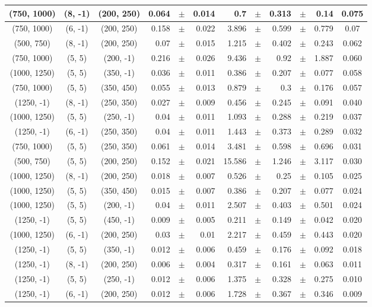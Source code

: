 \documentclass[12pt]{paper}
\begin{document}
\begin{table}[ht]
\begin{center}
{\begin{tabular}{|c|c|c|rrr|rrrrr|c|}
(750, 1000)&(8, -1)&(200, 250)&0.064&$\pm$&0.014&0.7&$\pm$&0.313&$\pm$&0.14&0.075\\\hline
(750, 1000)&(6, -1)&(200, 250)&0.158&$\pm$&0.022&3.896&$\pm$&0.599&$\pm$&0.779&0.07\\\hline
(500, 750)&(8, -1)&(200, 250)&0.07&$\pm$&0.015&1.215&$\pm$&0.402&$\pm$&0.243&0.062\\\hline
(750, 1000)&(5, 5)&(200, -1)&0.216&$\pm$&0.026&9.436&$\pm$&0.92&$\pm$&1.887&0.060\\\hline
(1000, 1250)&(5, 5)&(350, -1)&0.036&$\pm$&0.011&0.386&$\pm$&0.207&$\pm$&0.077&0.058\\\hline
(750, 1000)&(5, 5)&(350, 450)&0.055&$\pm$&0.013&0.879&$\pm$&0.3&$\pm$&0.176&0.057\\\hline
(1250, -1)&(8, -1)&(250, 350)&0.027&$\pm$&0.009&0.456&$\pm$&0.245&$\pm$&0.091&0.040\\\hline
(1000, 1250)&(5, 5)&(250, -1)&0.04&$\pm$&0.011&1.093&$\pm$&0.288&$\pm$&0.219&0.037\\\hline
(1250, -1)&(6, -1)&(250, 350)&0.04&$\pm$&0.011&1.443&$\pm$&0.373&$\pm$&0.289&0.032\\\hline
(750, 1000)&(5, 5)&(250, 350)&0.061&$\pm$&0.014&3.481&$\pm$&0.598&$\pm$&0.696&0.031\\\hline
(500, 750)&(5, 5)&(200, 250)&0.152&$\pm$&0.021&15.586&$\pm$&1.246&$\pm$&3.117&0.030\\\hline
(1000, 1250)&(8, -1)&(200, 250)&0.018&$\pm$&0.007&0.526&$\pm$&0.25&$\pm$&0.105&0.025\\\hline
(1000, 1250)&(5, 5)&(350, 450)&0.015&$\pm$&0.007&0.386&$\pm$&0.207&$\pm$&0.077&0.024\\\hline
(1000, 1250)&(5, 5)&(200, -1)&0.04&$\pm$&0.011&2.507&$\pm$&0.403&$\pm$&0.501&0.024\\\hline
(1250, -1)&(5, 5)&(450, -1)&0.009&$\pm$&0.005&0.211&$\pm$&0.149&$\pm$&0.042&0.020\\\hline
(1000, 1250)&(6, -1)&(200, 250)&0.03&$\pm$&0.01&2.217&$\pm$&0.459&$\pm$&0.443&0.020\\\hline
(1250, -1)&(5, 5)&(350, -1)&0.012&$\pm$&0.006&0.459&$\pm$&0.176&$\pm$&0.092&0.018\\\hline
(1250, -1)&(8, -1)&(200, 250)&0.006&$\pm$&0.004&0.317&$\pm$&0.161&$\pm$&0.063&0.011\\\hline
(1250, -1)&(5, 5)&(250, -1)&0.012&$\pm$&0.006&1.375&$\pm$&0.328&$\pm$&0.275&0.010\\\hline
(1250, -1)&(6, -1)&(200, 250)&0.012&$\pm$&0.006&1.728&$\pm$&0.367&$\pm$&0.346&0.009\\\hline

\end{tabular}}
\end{center}
\end{table}
\end{document}
